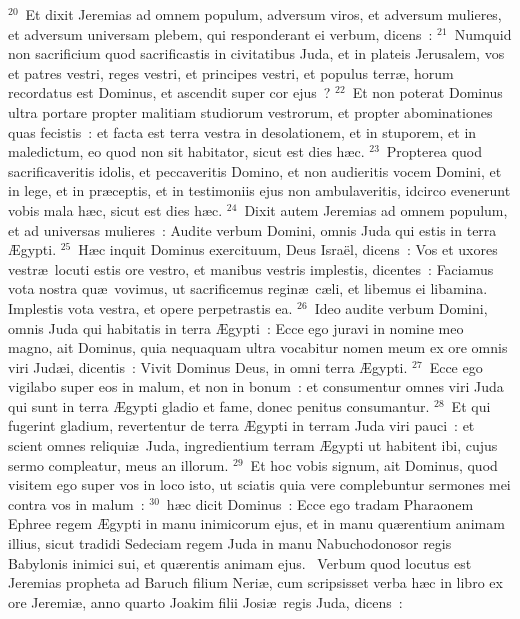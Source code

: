 ${}^{20}$~Et dixit Jeremias ad omnem populum, adversum viros, et adversum mulieres, et adversum universam plebem, qui responderant ei verbum, dicens~:
${}^{21}$~Numquid non sacrificium quod sacrificastis in civitatibus Juda, et in plateis Jerusalem, vos et patres vestri, reges vestri, et principes vestri, et populus terr\ae , horum recordatus est Dominus, et ascendit super cor ejus~?
${}^{22}$~Et non poterat Dominus ultra portare propter malitiam studiorum vestrorum, et propter abominationes quas fecistis~: et facta est terra vestra in desolationem, et in stuporem, et in maledictum, eo quod non sit habitator, sicut est dies h\ae c.
${}^{23}$~Propterea quod sacrificaveritis idolis, et peccaveritis Domino, et non audieritis vocem Domini, et in lege, et in pr\ae ceptis, et in testimoniis ejus non ambulaveritis, idcirco evenerunt vobis mala h\ae c, sicut est dies h\ae c.
${}^{24}$~Dixit autem Jeremias ad omnem populum, et ad universas mulieres~: Audite verbum Domini, omnis Juda qui estis in terra \AE gypti.
${}^{25}$~H\ae c inquit Dominus exercituum, Deus Isra\"el, dicens~: Vos et uxores vestr\ae\ locuti estis ore vestro, et manibus vestris implestis, dicentes~: Faciamus vota nostra qu\ae\ vovimus, ut sacrificemus regin\ae\ c\ae li, et libemus ei libamina. Implestis vota vestra, et opere perpetrastis ea.
${}^{26}$~Ideo audite verbum Domini, omnis Juda qui habitatis in terra \AE gypti~: Ecce ego juravi in nomine meo magno, ait Dominus, quia nequaquam ultra vocabitur nomen meum ex ore omnis viri Jud\ae i, dicentis~: Vivit Dominus Deus, in omni terra \AE gypti.
${}^{27}$~Ecce ego vigilabo super eos in malum, et non in bonum~: et consumentur omnes viri Juda qui sunt in terra \AE gypti gladio et fame, donec penitus consumantur.
${}^{28}$~Et qui fugerint gladium, revertentur de terra \AE gypti in terram Juda viri pauci~: et scient omnes reliqui\ae\ Juda, ingredientium terram \AE gypti ut habitent ibi, cujus sermo compleatur, meus an illorum.
${}^{29}$~Et hoc vobis signum, ait Dominus, quod visitem ego super vos in loco isto, ut sciatis quia vere complebuntur sermones mei contra vos in malum~:
${}^{30}$~h\ae c dicit Dominus~: Ecce ego tradam Pharaonem Ephree regem \AE gypti in manu inimicorum ejus, et in manu qu\ae rentium animam illius, sicut tradidi Sedeciam regem Juda in manu Nabuchodonosor regis Babylonis inimici sui, et qu\ae rentis animam ejus.
~\lettrine[lines=10,image=true,loversize=0.05,lraise=-0.03]{V}{}erbum quod locutus est Jeremias propheta ad Baruch filium Neri\ae , cum scripsisset verba h\ae c in libro ex ore Jeremi\ae , anno quarto Joakim filii Josi\ae\ regis Juda, dicens~:
